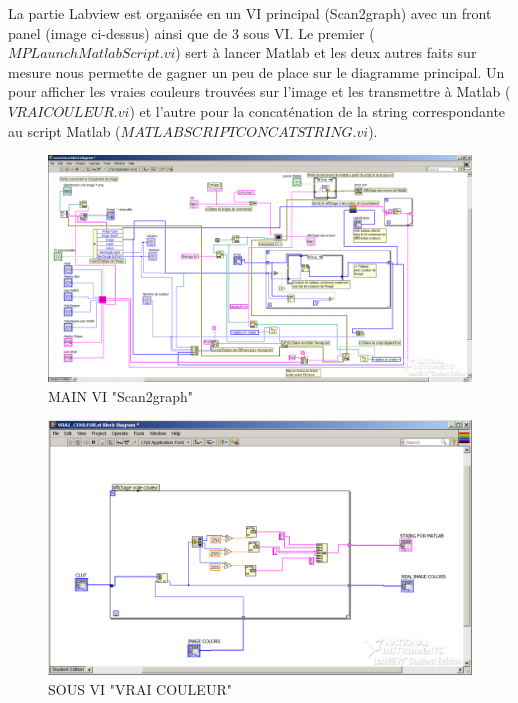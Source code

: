 \documentclass[11pt, a4paper, oneside]{article}   	%
\begin{document}
La partie Labview est organisée en un VI principal (Scan2graph) avec un front panel (image ci-dessus) ainsi que de 3 sous VI. Le premier ($MP LaunchMatlabScript.vi$) sert à lancer Matlab et les deux autres faits sur mesure nous permette de gagner un peu de place sur le diagramme principal. Un pour afficher les vraies couleurs trouvées sur l'image et les transmettre à Matlab ($VRAI COULEUR.vi$) et l'autre pour la concaténation de la string correspondante au script Matlab ($MATLAB SCRIPT CONCAT STRING.vi$).

\begin{figure}[H]
\begin{center}
	\includegraphics[scale =0.4]{images/MAIN_VI_ScanTest}
	\caption*{MAIN VI "Scan2graph"}
\end{center}
\end{figure}

\begin{figure}[H]
\begin{center}
	\includegraphics[scale =0.5]{images/SOUS_VI_AffichageVraiesCouleurs}
	\caption*{SOUS VI "VRAI COULEUR"}
\end{center}
\end{figure}
\end{document}
